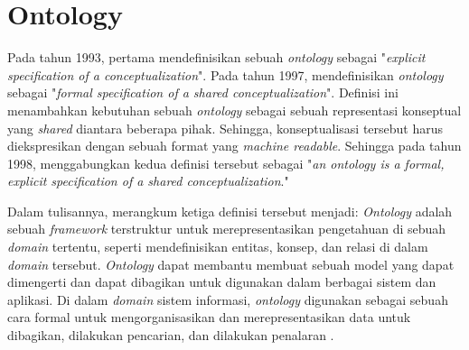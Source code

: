 \section{Ontology}
\label{sec:ontology}

Pada tahun 1993, \cite{gruber1993translation} pertama mendefinisikan sebuah \textit{ontology} sebagai "\textit{explicit specification of a conceptualization}". Pada tahun 1997, \cite{borst1997construction} mendefinisikan \textit{ontology} sebagai "\textit{formal specification of a shared conceptualization}". Definisi ini menambahkan kebutuhan sebuah \textit{ontology} sebagai sebuah representasi konseptual yang \textit{shared} diantara beberapa pihak. Sehingga, konseptualisasi tersebut harus diekspresikan dengan sebuah format yang \textit{machine readable}. Sehingga pada tahun 1998, \cite{studer1998knowledge} menggabungkan kedua definisi tersebut sebagai "\textit{an ontology is a formal, explicit specification of a shared conceptualization}."

Dalam tulisannya, \cite{Guarino2009} merangkum ketiga definisi tersebut menjadi: \textit{Ontology} adalah sebuah \textit{framework} terstruktur untuk merepresentasikan pengetahuan di sebuah \textit{domain} tertentu, seperti mendefinisikan entitas, konsep, dan relasi di dalam \textit{domain} tersebut. \textit{Ontology} dapat membantu membuat sebuah model yang dapat dimengerti dan dapat dibagikan untuk digunakan dalam berbagai sistem dan aplikasi. Di dalam \textit{domain} sistem informasi, \textit{ontology} digunakan sebagai sebuah cara formal untuk mengorganisasikan dan merepresentasikan data untuk dibagikan, dilakukan pencarian, dan dilakukan penalaran \parencite{Guarino2009}. 
